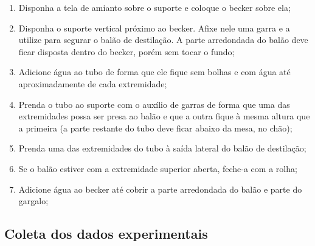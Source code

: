 \begin{enumerate}
\item Disponha a tela de amianto sobre o suporte e coloque o becker sobre ela;
\item Disponha o suporte vertical próximo ao becker. Afixe nele uma garra e a utilize para segurar o balão de destilação. A parte arredondada do balão deve ficar disposta dentro do becker, porém sem tocar o fundo;
\item Adicione água ao tubo de forma que ele fique sem bolhas e com água até aproximadamente  de cada extremidade;
\item Prenda o tubo ao suporte com o auxílio de garras de forma que uma das extremidades possa ser presa ao balão e que a outra fique à mesma altura que a primeira (a parte restante do tubo deve ficar abaixo da mesa, no chão);
\item Prenda uma das extremidades do tubo à saída lateral do balão de destilação;
\item Se o balão estiver com a extremidade superior aberta, feche-a com a rolha;
\item Adicione água ao becker até cobrir a parte arredondada do balão e parte do gargalo;
\end{enumerate}

\subsection{Coleta dos dados experimentais}

